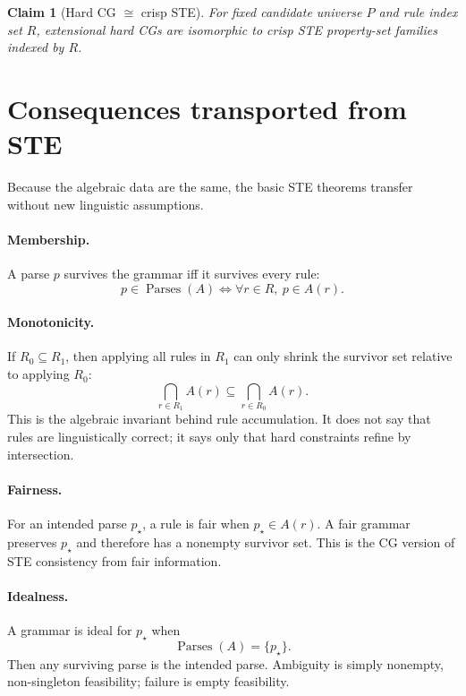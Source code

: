 \documentclass[11pt]{article}
\newtheorem{claim}{Claim}
\begin{document}
\begin{claim}[Hard CG $\cong$ crisp STE]
For fixed candidate universe $P$ and rule index set $R$, extensional hard CGs
are isomorphic to crisp STE property-set families indexed by $R$.
\end{claim}

\section{Consequences transported from STE}
Because the algebraic data are the same, the basic STE theorems transfer
without new linguistic assumptions.

\paragraph{Membership.}
A parse $p$ survives the grammar iff it survives every rule:
\[
  p\in\operatorname{Parses}(A) \iff \forall r\in R,\ p\in A(r).
\]

\paragraph{Monotonicity.}
If $R_0\subseteq R_1$, then applying all rules in $R_1$ can only shrink the
survivor set relative to applying $R_0$:
\[
  \bigcap_{r\in R_1} A(r) \subseteq \bigcap_{r\in R_0} A(r).
\]
This is the algebraic invariant behind rule accumulation.  It does not say that
rules are linguistically correct; it says only that hard constraints refine by
intersection.

\paragraph{Fairness.}
For an intended parse $p_\star$, a rule is fair when $p_\star\in A(r)$.  A fair
grammar preserves $p_\star$ and therefore has a nonempty survivor set.  This is
the CG version of STE consistency from fair information.

\paragraph{Idealness.}
A grammar is ideal for $p_\star$ when
\[
  \operatorname{Parses}(A)=\{p_\star\}.
\]
Then any surviving parse is the intended parse.  Ambiguity is simply nonempty,
non-singleton feasibility; failure is empty feasibility.
\end{document}
